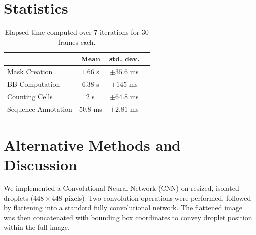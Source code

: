 \documentclass[12pt]{beamer}
\begin{document}
\begin{frame}[t]
\begin{multicols}{3}
\section{Statistics}

\begin{table}
    \centering
    \begin{tabular}{l|ccc}
        & \textbf{Mean} & \textbf{std. dev.}\\
        \midrule
        Mask Creation &  $1.66$ s & $\pm35.6$ ms \\
        BB Computation & $6.38$ s & $\pm 145$ ms\\
        Counting Cells & $2$ s& $\pm 64.8$ ms\\
        Sequence Annotation & $50.8$ ms& $\pm 2.81$ ms\\
    \end{tabular}
    \caption{Elapsed time computed over 7 iterations for 30 frames each.}
\end{table}

\section{Alternative Methods and Discussion}

\begin{multicols}{2}
We implemented a Convolutional Neural Network (CNN) on resized, isolated droplets ($448 \times 448$ pixels). Two convolution operations were performed, followed by flattening into a standard fully convolutional network. The flattened image was then concatenated with bounding box coordinates to convey droplet position within the full image.


\end{multicols}
\end{multicols}
\end{frame}
\end{document}
